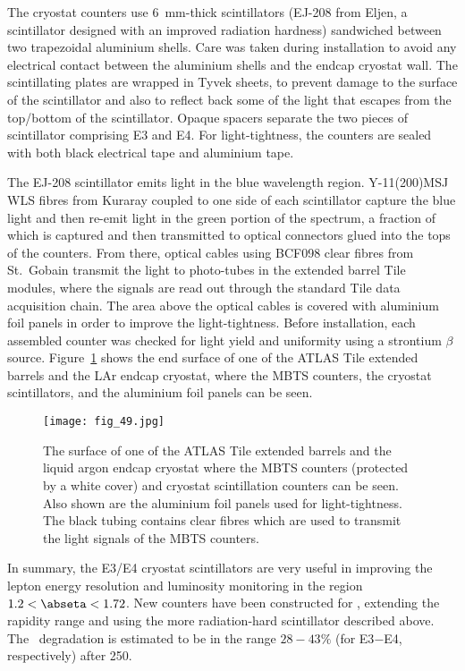 \documentclass[cernpreprint, atlasdraft=false, UKenglish,british,orcidlogo, texmf, orcidlogo]{atlasdoc}
\begin{document}
The cryostat counters use \SI{6}{\mm}-thick scintillators (EJ-208 from Eljen, a scintillator designed with an improved radiation hardness) sandwiched between two trapezoidal aluminium shells. Care was taken during installation to avoid any electrical contact between the aluminium shells and the endcap cryostat wall. The scintillating plates are wrapped in Tyvek sheets,
to prevent damage to the surface of the scintillator and also to reflect back some of the light that escapes from the top/bottom of the scintillator. Opaque spacers separate the two pieces of scintillator comprising E3 and E4. For light-tightness, the counters are sealed with both black electrical tape and aluminium tape.
 
The EJ-208 scintillator emits light in the blue wavelength region. Y-11(200)MSJ \gls{WLS} fibres from Kuraray coupled to one side of each scintillator capture the blue light and then re-emit light in the green portion of the spectrum, a fraction of which is captured and then transmitted  to optical connectors glued into the tops of the counters. From there,  optical cables using BCF098 clear fibres from St.~Gobain transmit the light to photo-tubes in the extended barrel \gls{Tile} modules, where the signals are read out through the standard \gls{Tile} data acquisition chain. The area above the optical cables is covered with aluminium foil panels in order to improve the light-tightness.
Before installation, each assembled counter was checked for light yield and uniformity using a strontium $\beta$ source.
Figure~\ref{fig_atlas_crack_MBTS} shows the end surface of one of the ATLAS \gls{Tile} extended barrels and the \gls{LAr} endcap cryostat,
where the \gls{MBTS} counters, the cryostat scintillators, and the aluminium foil panels can be seen.
 
\begin{figure}[h!]
\centering
\texttt{[image: fig\_49.jpg]}
\caption{The surface of one of the ATLAS \gls{Tile} extended barrels and the liquid argon endcap cryostat where the \gls{MBTS} counters (protected by a white cover) and cryostat scintillation counters can be seen.
Also shown are the aluminium foil panels used for light-tightness. The black tubing contains clear fibres which are used to transmit the light signals of the \gls{MBTS} counters.}
\label{fig_atlas_crack_MBTS}
\end{figure}
 
In summary, the E3/E4 cryostat scintillators are very useful in improving the lepton energy resolution and luminosity monitoring in the region $1.2 < \abseta < 1.72$. New counters have been constructed for \RunThr, extending the rapidity range and using the more radiation-hard scintillator described above. The \RunThr\ degradation is estimated to be in the range $28-43\%$ (for E3$-$E4, respectively) after \SI{250}{\ifb}.
 
\end{document}
